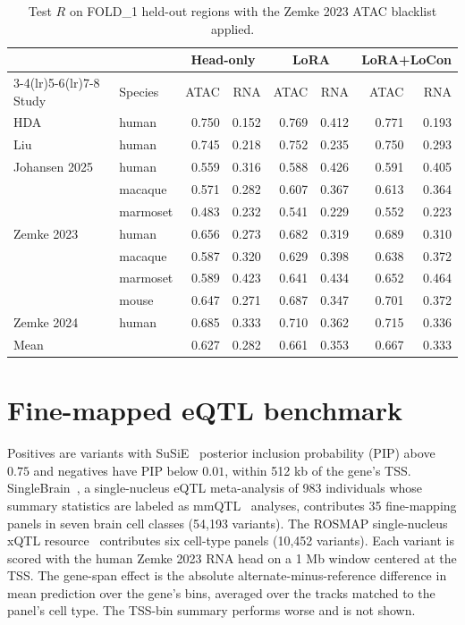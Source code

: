 \documentclass[11pt]{article}
\begin{document}
\begin{table}[ht]
\centering
\small
\caption{Test $R$ on FOLD\_1 held-out regions with the Zemke 2023 ATAC
blacklist applied.}
\label{tab:heldout}
\begin{tabular}{@{}llrrrrrr@{}}
\toprule
 & & \multicolumn{2}{c}{Head-only} & \multicolumn{2}{c}{LoRA} & \multicolumn{2}{c}{LoRA+LoCon} \\
\cmidrule(lr){3-4}\cmidrule(lr){5-6}\cmidrule(lr){7-8}
Study & Species & ATAC & RNA & ATAC & RNA & ATAC & RNA \\
\midrule
HDA & human & 0.750 & 0.152 & 0.769 & 0.412 & 0.771 & 0.193 \\
Liu & human & 0.745 & 0.218 & 0.752 & 0.235 & 0.750 & 0.293 \\
Johansen 2025 & human & 0.559 & 0.316 & 0.588 & 0.426 & 0.591 & 0.405 \\
 & macaque & 0.571 & 0.282 & 0.607 & 0.367 & 0.613 & 0.364 \\
 & marmoset & 0.483 & 0.232 & 0.541 & 0.229 & 0.552 & 0.223 \\
Zemke 2023 & human & 0.656 & 0.273 & 0.682 & 0.319 & 0.689 & 0.310 \\
 & macaque & 0.587 & 0.320 & 0.629 & 0.398 & 0.638 & 0.372 \\
 & marmoset & 0.589 & 0.423 & 0.641 & 0.434 & 0.652 & 0.464 \\
 & mouse & 0.647 & 0.271 & 0.687 & 0.347 & 0.701 & 0.372 \\
Zemke 2024 & human & 0.685 & 0.333 & 0.710 & 0.362 & 0.715 & 0.336 \\
\midrule
Mean & & 0.627 & 0.282 & 0.661 & 0.353 & 0.667 & 0.333 \\
\bottomrule
\end{tabular}
\end{table}

\section{Fine-mapped eQTL benchmark}
Positives are variants with SuSiE~\cite{wang2020} posterior inclusion
probability (PIP) above $0.75$ and negatives have PIP below $0.01$, within
512 kb of the gene's TSS.
SingleBrain~\cite{jang2026}, a single-nucleus eQTL meta-analysis of 983
individuals whose summary statistics are labeled as mmQTL~\cite{zeng2022}
analyses, contributes 35 fine-mapping panels in seven brain cell classes
(54,193 variants). The ROSMAP single-nucleus xQTL resource~\cite{cao2025}
contributes six cell-type panels (10,452 variants). Each variant is
scored with the human Zemke 2023 RNA head on a 1 Mb window centered at the
TSS. The gene-span effect is the absolute alternate-minus-reference
difference in mean prediction over the gene's bins, averaged over the tracks
matched to the panel's cell type. The TSS-bin summary performs worse and is
not shown.
\end{document}
